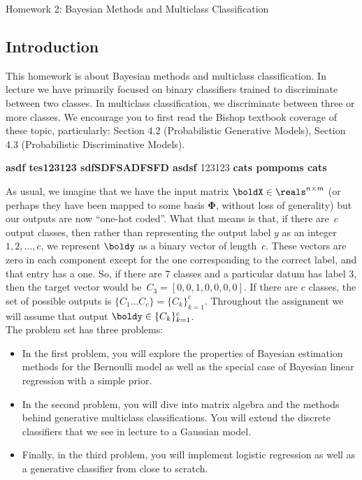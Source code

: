 \documentclass[submit]{harvardml}
\newenvironment{answer}{%
    \color{answergreen}\bf}
  {%
  }
\begin{document}
{
  \begin{center}
{\Large Homework 2: Bayesian Methods and Multiclass Classification}\\
\end{center}
}
\subsection*{Introduction}

This homework is about Bayesian methods 
and  multiclass classification. In lecture we have
primarily focused on binary classifiers trained to discriminate
between two classes. In multiclass classification, we discriminate
between three or more classes. We encourage you to first read the
Bishop textbook coverage of these topic, particularly: Section 4.2
(Probabilistic Generative Models), Section 4.3 (Probabilistic
Discriminative Models).

\textbf{\textcolor{answergreen}{asdf tes123123 sdfSDFSADFSFD asdsf }}
\textcolor{answergreen}{123123}
\begin{answer}
    cats pompoms cats 
\end{answer}

As usual, we imagine that we have the input matrix $\boldX \in
\reals^{n \times m}$ (or perhaps they have been mapped to some basis
$\bm{\Phi}$, without loss of generality) but our outputs are now
``one-hot coded''.  What that means is that, if there are~$c$ output
classes, then rather than representing the output label $y$ as an
integer~${1,2,\ldots,c}$, we represent $\boldy$ as a binary vector of
length~$c$. These vectors are zero in each
component except for the one corresponding to the correct label, and
that entry has a one.  So, if there are 7 classes and a particular
datum has label 3, then the target vector would be~${C_3 = [0,0,1,0,0,0,0]}$. 
If there are $c$ classes, the set of possible outputs is $\{C_1 \ldots C_c \} = \{C_k\}_{k=1}^c$.
Throughout the assignment we will assume
that output $\boldy \in \{C_k\}_{k=1}^c$.\\

The problem set has three problems: 
\begin{itemize}
\item In the first problem, you will explore the properties of Bayesian
estimation methods for the Bernoulli model as well as the special
case of Bayesian linear regression with a simple prior.
%
\item  In the second
problem, you will dive into  matrix algebra and the methods behind
generative multiclass classifications. You will extend the discrete classifiers  
that we see in  lecture to a Gaussian model.
%
\item Finally, in the third problem, you will implement 
 logistic regression as well as a generative classifier 
from close to scratch.
%
\end{itemize}
\end{document}
